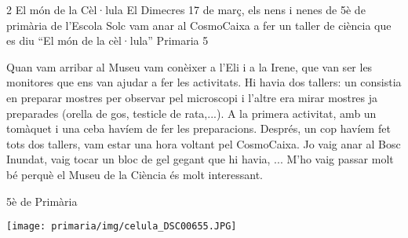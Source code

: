 \begin{news}
{2} %
{El món de la Cèl·lula}
{El Dimecres 17 de març, els nens i nenes de 5è de primària de l’Escola Solc vam anar al CosmoCaixa a fer un taller de ciència que es diu “El món de la cèl·lula”}
{Primaria}
{5} %



Quan vam arribar al Museu vam conèixer a l’Eli i a la Irene, que van ser les monitores que ens van ajudar a fer les activitats. Hi havia dos tallers: un consistia en preparar mostres per observar pel microscopi i l’altre era mirar mostres ja preparades (orella de gos, testicle de rata,...). A la primera activitat, amb un tomàquet i una ceba havíem de fer les preparacions.
Després, un cop havíem fet tots dos tallers, vam estar una hora voltant pel CosmoCaixa. Jo vaig anar al Bosc Inundat, vaig tocar un bloc de gel gegant que hi havia, ...
M’ho vaig passar molt bé perquè el Museu de la Ciència és molt interessant.


							{5è de Primària}

\noindent\texttt{[image: primaria/img/celula\_DSC00655.JPG]}

\end{news}

\newssep
